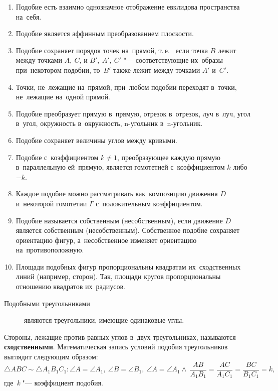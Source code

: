 \documentclass[]{scrartcl}
\begin{document}
\begin{enumerate}
	\item Подобие есть взаимно однозначное отображение евклидова пространства на~себя.
	\item Подобие является аффинным преобразованием плоскости.
	\item Подобие сохраняет порядок точек на~прямой, т.\,е.~ если точка ${\textstyle B}$ лежит между точками ${\textstyle A,\ C}$, и ${\textstyle B',\ A',\ C'}$ "--- соответствующие их~образы при~некотором подобии, то~${\textstyle B'}$ также лежит между точками ${\textstyle A'}$ и~${\textstyle C'}$.
	\item Точки, не~лежащие на~прямой, при~любом подобии переходят в~точки, не~лежащие на~одной прямой.
	\item Подобие преобразует прямую в~прямую, отрезок в~отрезок, луч в~луч, угол в~угол, окружность в~окружность, n-угольник в~n-угольник.
	\item Подобие сохраняет величины углов между кривыми.
	\item Подобие с~коэффициентом ${\textstyle k\not =1}$, преобразующее каждую прямую в~параллельную ей~прямую, является гомотетией с~коэффициентом ${\textstyle k}$ либо ${\textstyle -k}$.
	\item Каждое подобие можно рассматривать как~композицию движения ${\textstyle D}$ и~некоторой гомотетии ${\textstyle \Gamma}$ с~положительным коэффициентом.
	\item Подобие называется собственным (несобственным), если движение ${\textstyle D}$ является собственным (несобственным). Собственное подобие сохраняет ориентацию фигур, а~несобственное изменяет ориентацию на~противоположную.
	\item Площади подобных фигур пропорциональны квадратам их~сходственных линий (например, сторон). Так, площади кругов пропорциональны отношению квадратов их~радиусов.
\end{enumerate}
 
\begin{description}
	\item[Подобными треугольниками] являются треугольники, имеющие одинаковые углы. 
\end{description}  
Стороны, лежащие против равных углов в~двух треугольниках, называются \textbf{сходственными}. Математическая запись условий подобия треугольников выглядит следующим образом:
\begin{equation}\label{key}
\triangle ABC \sim \triangle A_{1}B_{1}C_{1}: \angle A = \angle A_{1},\ \angle B = \angle B_{1},\ \angle A = \angle A_{1} \wedge \ \frac{AB}{A_{1}B_{1}}=\frac{AC}{A_{1}C_{1}}=\frac{BC}{B_{1}C_{1}}=k,
\end{equation}
где~\textit{k} "--- коэффициент подобия.
\end{document}
